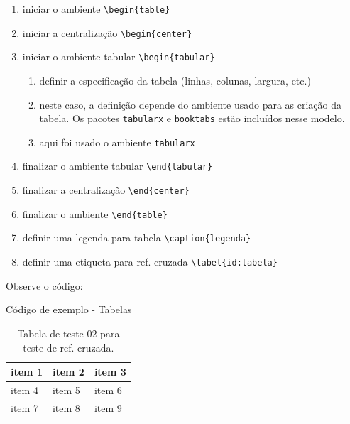\documentclass[a4paper,12pt,oneside]{memoir}
\begin{document}
\begin{enumerate}
\itemsep0em
    \item iniciar o ambiente \verb|\begin{table}|
    \item iniciar a centralização \verb|\begin{center}|
    \item iniciar o ambiente tabular \verb|\begin{tabular}|
    \begin{enumerate}
        \item definir a especificação da tabela (linhas, colunas, largura, etc.)
        \item neste caso, a definição depende do ambiente usado para as criação da tabela. Os pacotes \verb|tabularx| e \verb|booktabs| estão incluídos nesse modelo.
        \item aqui foi usado o ambiente \verb|tabularx|
    \end{enumerate}
    \item finalizar o ambiente tabular \verb|\end{tabular}|
    \item finalizar a centralização \verb|\end{center}|
    \item finalizar o ambiente \verb|\end{table}|
    \item definir uma legenda para tabela \verb|\caption{legenda}|
    \item definir uma etiqueta para ref. cruzada \verb|\label{id:tabela}|
\end{enumerate}

Observe o código:
\begin{codex}{Código de exemplo - Tabelas}
\begin{table}[h!]
\begin{center}
\begin{tabularx}{0.8\textwidth} { 
  | >{\centering\arraybackslash}X 
  | >{\centering\arraybackslash}X 
  | >{\centering\arraybackslash}X | }
 \hline
 item 1 & item 2 & item 3 \\
 \hline
 item 4  & item 5  & item 6  \\
 \hline
 item 7  & item 8  & item 9  \\
 \hline
\end{tabularx}
\caption{Tabela de teste 02 para teste de ref. cruzada.}
\label{table:2}
\end{center}
\end{table}
\end{codex}
\end{document}
